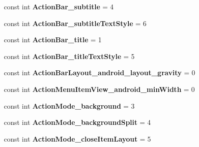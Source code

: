 \begin{DoxyCompactItemize}
const int {\bfseries Action\+Bar\+\_\+subtitle} = 4
\item 
\mbox{\label{class_pinned_app_1_1_droid_1_1_resource_1_1_styleable_acc6b2aa66ec4419ff66116989940c92d}} 
const int {\bfseries Action\+Bar\+\_\+subtitle\+Text\+Style} = 6
\item 
\mbox{\label{class_pinned_app_1_1_droid_1_1_resource_1_1_styleable_a330688d8fac6aba118cf07f0e842c4a0}} 
const int {\bfseries Action\+Bar\+\_\+title} = 1
\item 
\mbox{\label{class_pinned_app_1_1_droid_1_1_resource_1_1_styleable_a3489f66a155be2d403e6af616f5bdebf}} 
const int {\bfseries Action\+Bar\+\_\+title\+Text\+Style} = 5
\item 
\mbox{\label{class_pinned_app_1_1_droid_1_1_resource_1_1_styleable_a9819ada7e637cc78465d652c876b9c2e}} 
const int {\bfseries Action\+Bar\+Layout\+\_\+android\+\_\+layout\+\_\+gravity} = 0
\item 
\mbox{\label{class_pinned_app_1_1_droid_1_1_resource_1_1_styleable_a3b40a5877cc066ead77e100845362e3c}} 
const int {\bfseries Action\+Menu\+Item\+View\+\_\+android\+\_\+min\+Width} = 0
\item 
\mbox{\label{class_pinned_app_1_1_droid_1_1_resource_1_1_styleable_a422a6a023c1619f719a6fcde9b4d9553}} 
const int {\bfseries Action\+Mode\+\_\+background} = 3
\item 
\mbox{\label{class_pinned_app_1_1_droid_1_1_resource_1_1_styleable_ac6835f82df5b8e4e35d3eba9403c873f}} 
const int {\bfseries Action\+Mode\+\_\+background\+Split} = 4
\item 
\mbox{\label{class_pinned_app_1_1_droid_1_1_resource_1_1_styleable_a894f35ec8185dcd2d6565ef2701207bd}} 
const int {\bfseries Action\+Mode\+\_\+close\+Item\+Layout} = 5
\item 

\end{DoxyCompactItemize}
